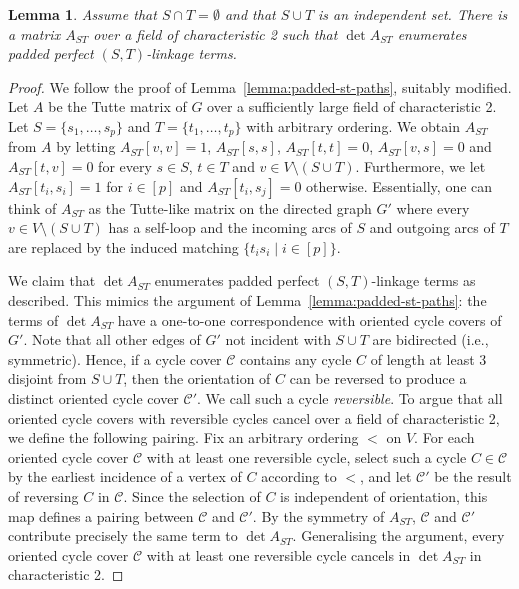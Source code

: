 \documentclass[10pt,a4paper]{article}
\newtheorem{lemma}{Lemma}[section]
\newcommand{\cC}{\ensuremath{\mathcal C}\xspace}
\begin{document}
\begin{lemma} \label{lemma:padded-st-linkages}
  Assume that $S \cap T = \emptyset$ and that $S \cup T$ is an
  independent set. 
  There is a matrix $A_{ST}$ over a field of characteristic 2 such
  that $\det A_{ST}$ enumerates padded perfect $(S, T)$-linkage terms.
\end{lemma}
\begin{proof}
  We follow the proof of Lemma~\ref{lemma:padded-st-paths}, suitably modified.
  Let $A$ be the Tutte matrix of $G$ over a sufficiently large field of characteristic 2.
  Let $S=\{s_1,\ldots,s_p\}$ and $T=\{t_1,\ldots,t_p\}$ with arbitrary ordering.
  We obtain $A_{ST}$ from $A$ by
  letting $A_{ST}[v, v] = 1$, $A_{ST}[s,s]$, $A_{ST}[t,t]=0$, $A_{ST}[v, s] = 0$ and $A_{ST}[t, v] = 0$ for every $s \in S$, 
  $t \in T$ and $v \in V \setminus (S \cup T)$. Furthermore,
  we let $A_{ST}[t_i,s_i]=1$ for $i \in [p]$ and $A_{ST}[t_i,s_j]=0$ otherwise. 
  Essentially, one can think of $A_{ST}$ as the Tutte-like matrix on
  the directed graph $G'$ where every $v \in V \setminus (S \cup T)$
  has a self-loop and the incoming arcs of $S$ and outgoing arcs of $T$ are replaced by
  the induced matching $\{t_is_i \mid i \in [p]\}$. 

  We claim that $\det A_{ST}$ enumerates padded perfect $(S, T)$-linkage terms as described.
  This mimics the argument of Lemma~\ref{lemma:padded-st-paths}: the terms of $\det A_{ST}$ have 
  a one-to-one correspondence with oriented cycle covers of $G'$.
  Note that all other edges of $G'$ not incident with $S \cup T$ are bidirected (i.e., symmetric).
  Hence, if a cycle cover $\cC$ contains any cycle $C$ of length at least 3 disjoint from $S \cup T$,
  then the orientation of $C$ can be reversed to produce a distinct oriented cycle cover $\cC'$.
  We call such a cycle \emph{reversible}.
  To argue that all oriented cycle covers with reversible cycles cancel over a field
  of characteristic 2, we define the following pairing. Fix an
  arbitrary ordering $<$ on $V$. For each oriented cycle cover $\cC$ with
  at least one reversible cycle, select such a cycle $C \in \cC$
  by the earliest incidence of a vertex of $C$ according to $<$,
  and let $\cC'$ be the result of reversing $C$ in $\cC$. Since
  the selection of $C$ is independent of orientation, this map defines
  a pairing between $\cC$ and $\cC'$. By the symmetry of $A_{ST}$,
  $\cC$ and $\cC'$ contribute precisely the same term to $\det A_{ST}$.
  Generalising the argument, every oriented cycle cover $\cC$ with at
  least one reversible cycle cancels in $\det A_{ST}$ in characteristic 2. 


\end{proof}
\end{document}
